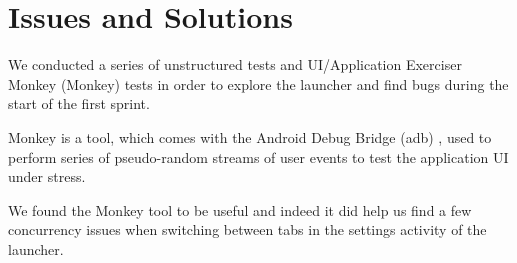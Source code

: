 
\section{Issues and Solutions}

We conducted a series of unstructured tests and UI/Application Exerciser Monkey (Monkey)  tests in order to explore the launcher and find bugs during the start of the first sprint. 


Monkey is a tool, which comes with the Android Debug Bridge (adb) , used to perform series of pseudo-random streams of user events to test the application UI under stress.

We found the Monkey tool to be useful and indeed it did help us find a few concurrency issues when switching between tabs in the settings activity of the launcher.